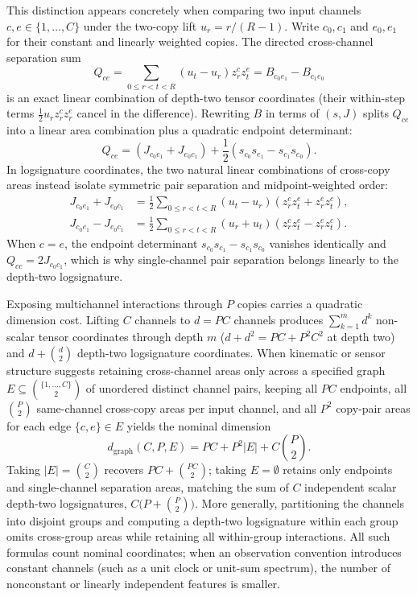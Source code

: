 This distinction appears concretely when comparing two input channels
\(c, e \in \{1, \ldots, C\}\) under the two-copy lift \(u_r = r/(R-1)\). Write
\(c_0, c_1\) and \(e_0, e_1\) for their constant and linearly weighted copies.
The directed cross-channel separation sum
\[
 Q_{ce} = \sum_{0 \leq r < t < R} (u_t - u_r) z_r^c z_t^e
        = B_{c_0 e_1} - B_{c_1 e_0}
\]
is an exact linear combination of depth-two tensor coordinates (their within-step
terms \(\tfrac12 u_r z_r^c z_r^e\) cancel in the difference). Rewriting \(B\) in
terms of \((s, J)\) splits \(Q_{ce}\) into a linear area combination plus a
quadratic endpoint determinant:
\[
 Q_{ce} = (J_{c_0 e_1} + J_{e_0 c_1})
        + \frac{1}{2}(s_{c_0} s_{e_1} - s_{c_1} s_{e_0}).
\]
In logsignature coordinates, the two natural linear combinations of cross-copy
areas instead isolate symmetric pair separation and midpoint-weighted order:
\begin{align*}
 J_{c_0 e_1} + J_{e_0 c_1}
   &= \frac{1}{2}\sum_{0 \leq r < t < R} (u_t - u_r)(z_r^c z_t^e + z_r^e z_t^c), \\
 J_{c_0 e_1} - J_{e_0 c_1}
   &= \frac{1}{2}\sum_{0 \leq r < t < R} (u_r + u_t)(z_r^c z_t^e - z_r^e z_t^c).
\end{align*}
When \(c = e\), the endpoint determinant \(s_{c_0} s_{c_1} - s_{c_1} s_{c_0}\)
vanishes identically and \(Q_{cc} = 2 J_{c_0 c_1}\), which is why single-channel
pair separation belongs linearly to the depth-two logsignature.

Exposing multichannel interactions through \(P\) copies carries a quadratic
dimension cost. Lifting \(C\) channels to \(d = PC\) channels produces
\(\sum_{k=1}^m d^k\) non-scalar tensor coordinates through depth \(m\)
(\(d + d^2 = PC + P^2 C^2\) at depth two) and \(d + \binom{d}{2}\) depth-two
logsignature coordinates. When kinematic or sensor structure suggests retaining
cross-channel areas only across a specified graph \(E \subseteq \binom{\{1,\ldots,C\}}{2}\)
of unordered distinct channel pairs, keeping all \(PC\) endpoints, all
\(\binom{P}{2}\) same-channel cross-copy areas per input channel, and all \(P^2\)
copy-pair areas for each edge \(\{c, e\} \in E\) yields the nominal dimension
\begin{equation}\label{eq:graph-dimension}
 d_{\mathrm{graph}}(C, P, E) = PC + P^2 |E| + C\binom{P}{2}.
\end{equation}
Taking \(|E| = \binom{C}{2}\) recovers \(PC + \binom{PC}{2}\); taking \(E = \emptyset\)
retains only endpoints and single-channel separation areas, matching the sum of
\(C\) independent scalar depth-two logsignatures,
\(C\bigl(P + \binom{P}{2}\bigr)\). More generally, partitioning the channels into
disjoint groups and computing a depth-two logsignature within each group omits
cross-group areas while retaining all within-group interactions. All such
formulas count nominal coordinates; when an observation convention introduces
constant channels (such as a unit clock or unit-sum spectrum), the number of
nonconstant or linearly independent features is smaller.

